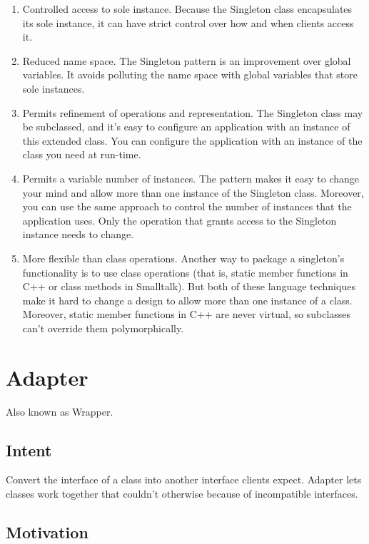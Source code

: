\begin{enumerate}
    \item Controlled access to sole instance. Because the Singleton class encapsulates its sole instance, it can have strict control over how and when clients access it.
    \item Reduced name space. The Singleton pattern is an improvement over global variables. It avoids polluting the name space with global variables that store sole instances.
    \item Permits refinement of operations and representation. The Singleton class may be subclassed, and it's easy to configure an application with an instance of this extended class. You can configure the application with an instance of the class you need at run-time.
    \item Permits a variable number of instances. The pattern makes it easy to change your mind and allow more than one instance of the Singleton class. Moreover, you can use the same approach to control the number of instances that the application uses. Only the operation that grants access to the Singleton instance needs to change.
    \item More flexible than class operations. Another way to package a singleton's functionality is to use class operations (that is, static member functions in C++ or class methods in Smalltalk). But both of these language techniques make it hard to change a design to allow more than one instance of a class. Moreover, static member functions in C++ are never virtual, so subclasses can't override them polymorphically.
\end{enumerate}

\section{Adapter}

Also known as Wrapper.

\subsection*{Intent}

Convert the interface of a class into another interface clients expect. Adapter lets classes work together that couldn't otherwise because of incompatible interfaces.

\subsection*{Motivation}

